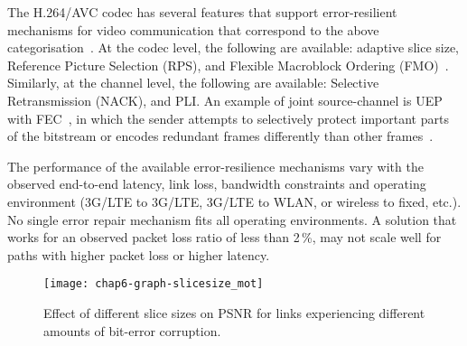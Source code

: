 The H.264/AVC codec has several features that support error-resilient
mechanisms for video communication that correspond to the above
categorisation~\cite{310669}. At the codec level, the following are available:
adaptive slice size, Reference Picture Selection (RPS), and Flexible
Macroblock Ordering (FMO)~\cite{err_res_h264_std, wenger_ott_jscc}. Similarly,
at the channel level, the following are available: Selective Retransmission
(NACK), and PLI. An example of joint source-channel is UEP with
FEC~\cite{wang00review}, in which the sender
attempts to selectively protect important parts of the bitstream or
encodes redundant frames differently than other frames~\cite{ervcuupkp}.

The performance of the available error-resilience mechanisms vary with the
observed end-to-end latency, link loss, bandwidth constraints and operating
environment (3G/LTE to 3G/LTE, 3G/LTE to WLAN, or wireless to fixed, etc.). No
single error repair mechanism fits all operating environments. A solution that
works for an observed packet loss ratio of less than 2\,\%, may not scale well
for paths with higher packet loss or higher latency.


\begin{figure}[!t]
\centerline {
\texttt{[image: chap6-graph-slicesize\_mot]}
}
\caption{Effect of different slice sizes on PSNR for links experiencing different amounts of bit-error corruption.}
\label{fig:slicesize_mot}
\end{figure}

